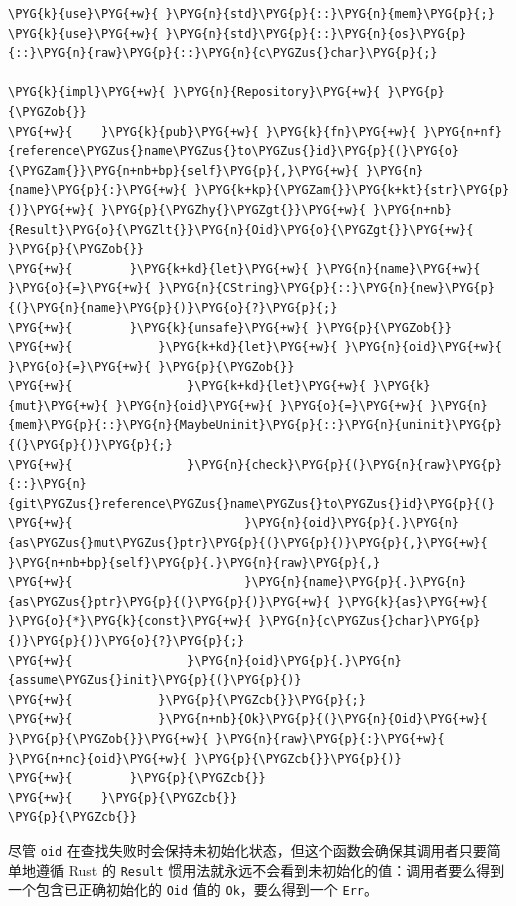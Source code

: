 \begin{Verbatim}[commandchars=\\\{\},breaklines=true,breakanywhere=true,fontsize=\codefont,xleftmargin=17bp]
\PYG{k}{use}\PYG{+w}{ }\PYG{n}{std}\PYG{p}{::}\PYG{n}{mem}\PYG{p}{;}
\PYG{k}{use}\PYG{+w}{ }\PYG{n}{std}\PYG{p}{::}\PYG{n}{os}\PYG{p}{::}\PYG{n}{raw}\PYG{p}{::}\PYG{n}{c\PYGZus{}char}\PYG{p}{;}

\PYG{k}{impl}\PYG{+w}{ }\PYG{n}{Repository}\PYG{+w}{ }\PYG{p}{\PYGZob{}}
\PYG{+w}{    }\PYG{k}{pub}\PYG{+w}{ }\PYG{k}{fn}\PYG{+w}{ }\PYG{n+nf}{reference\PYGZus{}name\PYGZus{}to\PYGZus{}id}\PYG{p}{(}\PYG{o}{\PYGZam{}}\PYG{n+nb+bp}{self}\PYG{p}{,}\PYG{+w}{ }\PYG{n}{name}\PYG{p}{:}\PYG{+w}{ }\PYG{k+kp}{\PYGZam{}}\PYG{k+kt}{str}\PYG{p}{)}\PYG{+w}{ }\PYG{p}{\PYGZhy{}\PYGZgt{}}\PYG{+w}{ }\PYG{n+nb}{Result}\PYG{o}{\PYGZlt{}}\PYG{n}{Oid}\PYG{o}{\PYGZgt{}}\PYG{+w}{ }\PYG{p}{\PYGZob{}}
\PYG{+w}{        }\PYG{k+kd}{let}\PYG{+w}{ }\PYG{n}{name}\PYG{+w}{ }\PYG{o}{=}\PYG{+w}{ }\PYG{n}{CString}\PYG{p}{::}\PYG{n}{new}\PYG{p}{(}\PYG{n}{name}\PYG{p}{)}\PYG{o}{?}\PYG{p}{;}
\PYG{+w}{        }\PYG{k}{unsafe}\PYG{+w}{ }\PYG{p}{\PYGZob{}}
\PYG{+w}{            }\PYG{k+kd}{let}\PYG{+w}{ }\PYG{n}{oid}\PYG{+w}{ }\PYG{o}{=}\PYG{+w}{ }\PYG{p}{\PYGZob{}}
\PYG{+w}{                }\PYG{k+kd}{let}\PYG{+w}{ }\PYG{k}{mut}\PYG{+w}{ }\PYG{n}{oid}\PYG{+w}{ }\PYG{o}{=}\PYG{+w}{ }\PYG{n}{mem}\PYG{p}{::}\PYG{n}{MaybeUninit}\PYG{p}{::}\PYG{n}{uninit}\PYG{p}{(}\PYG{p}{)}\PYG{p}{;}
\PYG{+w}{                }\PYG{n}{check}\PYG{p}{(}\PYG{n}{raw}\PYG{p}{::}\PYG{n}{git\PYGZus{}reference\PYGZus{}name\PYGZus{}to\PYGZus{}id}\PYG{p}{(}
\PYG{+w}{                        }\PYG{n}{oid}\PYG{p}{.}\PYG{n}{as\PYGZus{}mut\PYGZus{}ptr}\PYG{p}{(}\PYG{p}{)}\PYG{p}{,}\PYG{+w}{ }\PYG{n+nb+bp}{self}\PYG{p}{.}\PYG{n}{raw}\PYG{p}{,}
\PYG{+w}{                        }\PYG{n}{name}\PYG{p}{.}\PYG{n}{as\PYGZus{}ptr}\PYG{p}{(}\PYG{p}{)}\PYG{+w}{ }\PYG{k}{as}\PYG{+w}{ }\PYG{o}{*}\PYG{k}{const}\PYG{+w}{ }\PYG{n}{c\PYGZus{}char}\PYG{p}{)}\PYG{p}{)}\PYG{o}{?}\PYG{p}{;}
\PYG{+w}{                }\PYG{n}{oid}\PYG{p}{.}\PYG{n}{assume\PYGZus{}init}\PYG{p}{(}\PYG{p}{)}
\PYG{+w}{            }\PYG{p}{\PYGZcb{}}\PYG{p}{;}
\PYG{+w}{            }\PYG{n+nb}{Ok}\PYG{p}{(}\PYG{n}{Oid}\PYG{+w}{ }\PYG{p}{\PYGZob{}}\PYG{+w}{ }\PYG{n}{raw}\PYG{p}{:}\PYG{+w}{ }\PYG{n+nc}{oid}\PYG{+w}{ }\PYG{p}{\PYGZcb{}}\PYG{p}{)}
\PYG{+w}{        }\PYG{p}{\PYGZcb{}}
\PYG{+w}{    }\PYG{p}{\PYGZcb{}}
\PYG{p}{\PYGZcb{}}
\end{Verbatim}

尽管 \texttt{oid} 在查找失败时会保持未初始化状态，但这个函数会确保其调用者只要简单地遵循 Rust 的 \texttt{Result} 惯用法就永远不会看到未初始化的值：调用者要么得到一个包含已正确初始化的 \texttt{Oid} 值的 \texttt{Ok}，要么得到一个 \texttt{Err}。

